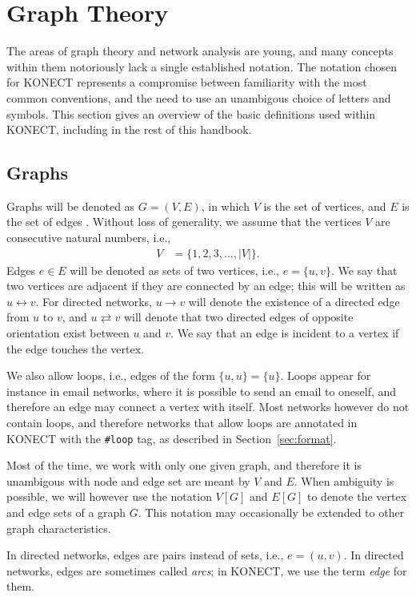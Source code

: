 \documentclass{article}
\begin{document}
\section{Graph Theory}
\label{sec:definitions}
The areas of graph theory and network analysis are young, and
many concepts within them notoriously lack a single established notation.  The
notation chosen for KONECT represents a compromise between familiarity
with the most common conventions, and the need to use an unambigous
choice of letters and symbols.  This section gives an overview of the
basic definitions used within KONECT, including in the rest of this handbook. 

\subsection{Graphs}
Graphs will be denoted as $G=(V,E)$, in which $V$ is the set of
vertices, and $E$ is the set of edges \citep{b116}. Without loss of
generality, we assume that the vertices $V$ are consecutive natural
numbers, i.e.,
\begin{align}
  V &= \{ 1, 2, 3, \dotsc, |V| \}.
\end{align}
Edges $e\in E$ will be denoted as sets of two vertices, i.e.,
$e=\{u,v\}$.  We say that two vertices are adjacent if they are
connected by an edge; this will be written as $u \leftrightarrow v$. 
For directed networks, $u \rightarrow v$ will denote the existence of a
directed edge from $u$ to $v$, and $u \rightleftarrows v$ will denote
that two directed edges of opposite orientation exist between $u$ and $v$.
We say that an
edge is incident to a vertex if the edge touches the vertex.

We also allow loops, i.e., edges of the form $\{u,u\}=\{u\}$.  Loops
appear for instance in email networks, where it is possible to send an
email to oneself, and therefore an edge may connect a vertex with
itself.  Most networks however do not contain loops, and therefore
networks that allow loops are annotated in KONECT with the 
\texttt{\#loop} tag, as described in Section~\ref{sec:format}. 

Most of the time, we work with only one given graph, and therefore it is
unambigous with node and edge set are meant by $V$ and $E$.  When
ambiguity is possible, we will however use the notation
$V[G]$ and $E[G]$ to denote the vertex and edge sets of a graph $G$.
This notation may occasionally be extended to other graph
characteristics. 

In directed networks, edges are pairs instead of sets, i.e.,
$e=(u,v)$.  In directed networks, edges are sometimes called
\emph{arcs}; in KONECT, we use the term \emph{edge} for them. 
\end{document}

